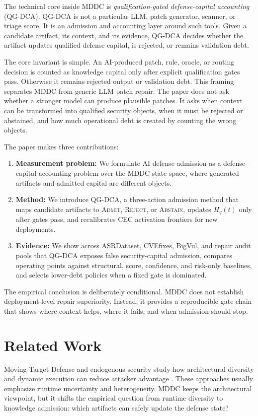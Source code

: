 ﻿\documentclass[lettersize,journal]{IEEEtran}
\begin{document}
The technical core inside MDDC is \emph{qualification-gated defense-capital accounting} (QG-DCA). QG-DCA is not a particular LLM, patch generator, scanner, or triage score. It is an admission and accounting layer around such tools. Given a candidate artifact, its context, and its evidence, QG-DCA decides whether the artifact updates qualified defense capital, is rejected, or remains validation debt.

The core invariant is simple. An AI-produced patch, rule, oracle, or routing decision is counted as knowledge capital only after explicit qualification gates pass. Otherwise it remains rejected output or validation debt. This framing separates MDDC from generic LLM patch repair. The paper does not ask whether a stronger model can produce plausible patches. It asks when context can be transformed into qualified security objects, when it must be rejected or abstained, and how much operational debt is created by counting the wrong objects.

The paper makes three contributions:
\begin{enumerate}
    \item \textbf{Measurement problem:} We formulate AI defense admission as a defense-capital accounting problem over the MDDC state space, where generated artifacts and admitted capital are different objects.
    \item \textbf{Method:} We introduce QG-DCA, a three-action admission method that maps candidate artifacts to \textsc{Admit}, \textsc{Reject}, or \textsc{Abstain}, updates $H_q(t)$ only after gates pass, and recalibrates CEC activation frontiers for new deployments.
    \item \textbf{Evidence:} We show across ASRDataset, CVEfixes, BigVul, and repair audit pools that QG-DCA exposes false security-capital admission, compares operating points against structural, score, confidence, and risk-only baselines, and selects lower-debt policies when a fixed gate is dominated.
\end{enumerate}

The empirical conclusion is deliberately conditional. MDDC does not establish deployment-level repair superiority. Instead, it provides a reproducible gate chain that shows where context helps, where it fails, and when admission should stop.

\section{Related Work}
Moving Target Defense and endogenous security study how architectural diversity and dynamic execution can reduce attacker advantage \cite{ref7,ref5}. These approaches usually emphasize runtime uncertainty and heterogeneity. MDDC keeps the architectural viewpoint, but it shifts the empirical question from runtime diversity to knowledge admission: which artifacts can safely update the defense state?
\end{document}
